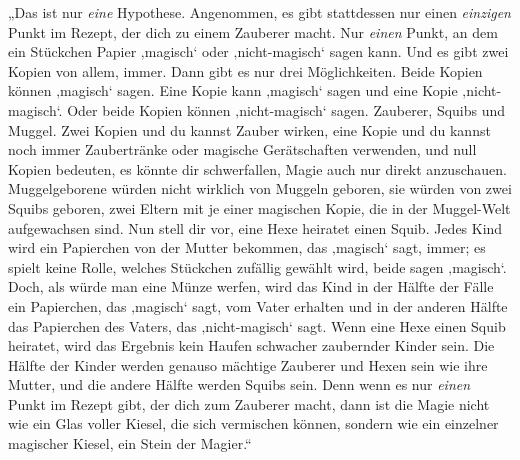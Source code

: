 „Das ist nur \emph{eine} Hypothese. Angenommen, es gibt stattdessen nur einen \emph{einzigen} Punkt im Rezept, der dich zu einem Zauberer macht. Nur \emph{einen} Punkt, an dem ein Stückchen Papier ‚magisch‘ oder ‚nicht-magisch‘ sagen kann. Und es gibt zwei Kopien von allem, immer. Dann gibt es nur drei Möglichkeiten. Beide Kopien können ‚magisch‘ sagen. Eine Kopie kann ‚magisch‘ sagen und eine Kopie ‚nicht-magisch‘. Oder beide Kopien können ‚nicht-magisch‘ sagen. Zauberer, Squibs und Muggel. Zwei Kopien und du kannst Zauber wirken, eine Kopie und du kannst noch immer Zaubertränke oder magische Gerätschaften verwenden, und null Kopien bedeuten, es könnte dir schwerfallen, Magie auch nur direkt anzuschauen. Muggelgeborene würden nicht wirklich von Muggeln geboren, sie würden von zwei Squibs geboren, zwei Eltern mit je einer magischen Kopie, die in der Muggel-Welt aufgewachsen sind. Nun stell dir vor, eine Hexe heiratet einen Squib. Jedes Kind wird ein Papierchen von der Mutter bekommen, das ‚magisch‘ sagt, immer; es spielt keine Rolle, welches Stückchen zufällig gewählt wird, beide sagen ‚magisch‘. Doch, als würde man eine Münze werfen, wird das Kind in der Hälfte der Fälle ein Papierchen, das ‚magisch‘ sagt, vom Vater erhalten und in der anderen Hälfte das Papierchen des Vaters, das ‚nicht-magisch‘ sagt. Wenn eine Hexe einen Squib heiratet, wird das Ergebnis kein Haufen schwacher zaubernder Kinder sein. Die Hälfte der Kinder werden genauso mächtige Zauberer und Hexen sein wie ihre Mutter, und die andere Hälfte werden Squibs sein. Denn wenn es nur \emph{einen} Punkt im Rezept gibt, der dich zum Zauberer macht, dann ist die Magie nicht wie ein Glas voller Kiesel, die sich vermischen können, sondern wie ein einzelner magischer Kiesel, ein Stein der Magier.“%

